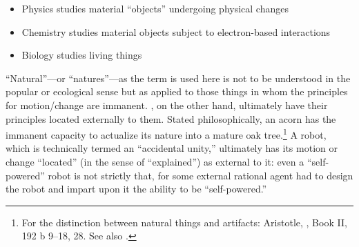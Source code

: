 \begin{itemize}
\item Physics studies  material ``objects'' undergoing physical changes
\item Chemistry studies  material objects subject to electron-based interactions
\item Biology studies  living things
\end{itemize}

``Natural''---or ``natures''---as the term is used here is not to be understood in the popular or ecological sense but as applied to those things in whom the principles for motion/change are immanent. , on the other hand, ultimately have their principles located externally to them. Stated philosophically, an acorn has the immanent capacity to actualize its nature into a mature oak tree.\footnote{For the distinction between natural things and artifacts: Aristotle, , Book II, 192 b 9--18, 28. See also \citet{stump2006}.} A robot, which is technically termed an ``accidental unity,'' ultimately has its motion or change ``located'' (in the sense of ``explained'') as external to it: even a ``self-powered'' robot is not strictly that, for some external rational agent had to design the robot and impart upon it the ability to be ``self-powered.''

